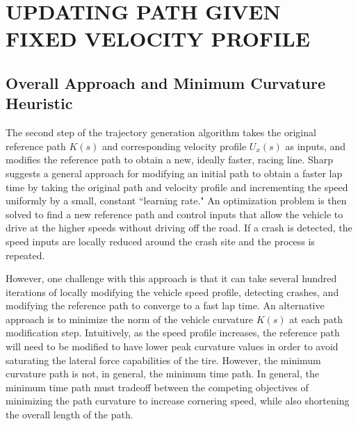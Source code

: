 \documentclass[twocolumn,10pt, final]{asme2e}
\begin{document}
\section*{UPDATING PATH GIVEN FIXED VELOCITY PROFILE}
\subsection*{Overall Approach and Minimum Curvature Heuristic}
The second step of the trajectory generation algorithm takes the original reference path $K(s)$ and corresponding velocity profile $U_x(s)$
as inputs, and modifies the reference path to obtain a new, ideally faster, racing line. Sharp \cite{sharp} suggests a general approach for modifying 
an initial path to obtain a faster lap time by taking the original path and velocity profile and incrementing the speed uniformly
by a small, constant ``learning rate." An optimization problem is then solved to find a new reference path and control inputs that allow the vehicle to
drive at the higher speeds without driving off the road. If a crash is detected, the speed inputs are locally reduced around the crash site and the process is repeated.

However, one challenge with this approach is that it can take several hundred iterations of locally modifying the vehicle speed profile, detecting crashes, and 
 modifying the reference path to converge to a fast lap time. An alternative approach is to minimize
 the norm of the vehicle curvature $K(s)$ at each path modification step. Intuitively, as the speed profile increases,
 the reference path will need to be modified to have lower peak curvature values in order to avoid saturating the lateral force capabilities of the tire.
 However, the minimum curvature path is not, in general, the minimum time path. In general, the minimum time path must tradeoff between the competing objectives of minimizing the path curvature to increase cornering speed,
while also shortening the overall length of the path.
\end{document}

